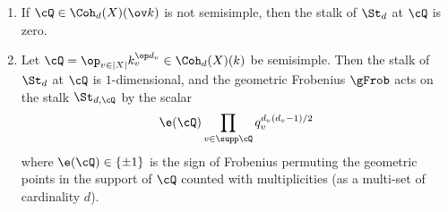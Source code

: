 \begin{prop}
\notready\label{p:St}
\begin{enumerate}
\item If $\cQ\in \Coh_{d}(X)(\ov k)$ is not semisimple, then the stalk of $\St_{d}$ at $\cQ$ is zero.
\item Let $\cQ=\op_{v\in |X|}k_v^{\op d_{v}}\in \Coh_{d}(X)(k)$ be semisimple. Then the stalk of  $\St_{d}$ at $\cQ$ is $1$-dimensional, and the geometric Frobenius $\gFrob$ acts on the stalk $\St_{d,\cQ}$ by the scalar
\begin{equation*}
\e(\cQ)\prod_{v\in \supp\cQ}q_{v}^{d_{v}(d_{v}-1)/2}
\end{equation*}
where $\e(\cQ)\in\{\pm1\}$ is the sign of Frobenius permuting the geometric points in the support of $\cQ$ counted with multiplicities (as a multi-set of cardinality $d$).
\end{enumerate}
\end{prop}

